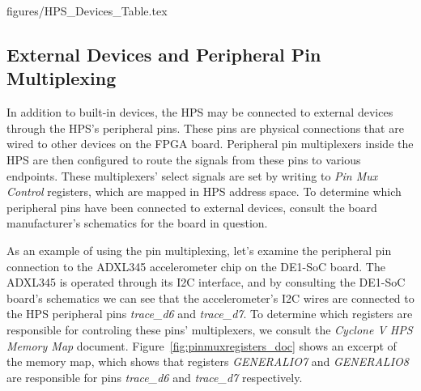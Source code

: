 \documentclass[11pt, twoside, pdftex]{article}
\begin{document}
 {figures/HPS_Devices_Table.tex}

\subsection{External Devices and Peripheral Pin Multiplexing}
\label{sec:pinmuxing}

In addition to built-in devices, the HPS may be connected to external devices through the HPS's peripheral pins. 
These pins are physical connections that are wired to other devices on the FPGA board. 
Peripheral pin multiplexers inside the HPS are then configured to route the signals from these pins to various endpoints. These multiplexers' select signals are set by
writing to \textit{Pin Mux Control} registers, which are mapped in HPS address space. %
To determine which peripheral pins have been connected to external devices, consult the board manufacturer's 
schematics for the board in question. %

As an example of using the pin multiplexing, let's examine the peripheral pin connection to the ADXL345 accelerometer chip on the DE1-SoC board. The ADXL345 is operated through its I2C interface, and by consulting the DE1-SoC board's schematics we can see that the accelerometer's I2C wires are connected to the HPS peripheral pins \textit{trace\_d6} and \textit{trace\_d7}. To determine which registers are responsible for controling these pins' multiplexers, we consult the \textit{Cyclone V HPS Memory Map} document. Figure~\ref{fig:pinmuxregisters_doc} shows an excerpt of the memory map, which shows that registers \textit{GENERALIO7} and \textit{GENERALIO8} are responsible for pins \textit{trace\_d6} and \textit{trace\_d7} respectively.
\end{document}

